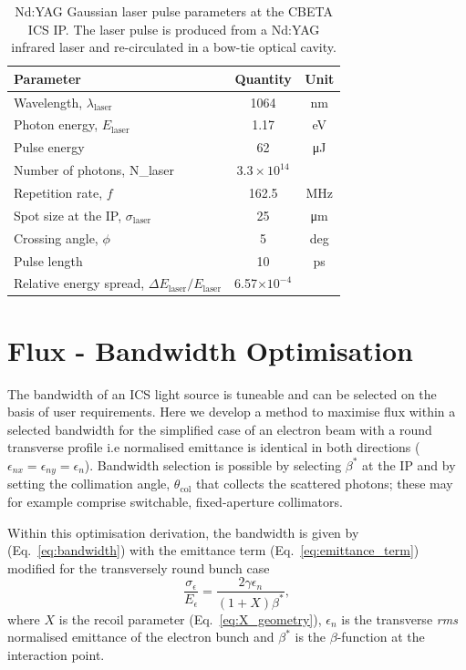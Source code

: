 \documentclass[../main.tex]{subfiles}
\begin{document}
\begin{table}[!h]
\centering
\caption{Nd:YAG Gaussian laser pulse parameters at the CBETA ICS IP. The laser pulse is produced from a Nd:YAG infrared laser and re-circulated in a bow-tie optical cavity.}
\begin{tabular}{lcc}
\hline\hline
Parameter & Quantity & Unit \\
\hline
Wavelength, $\lambda_\textrm{laser}$ & 1064 & nm\\
Photon energy, $E_\textrm{laser}$ & 1.17 & eV\\
Pulse energy  & 62 & \si{\micro\joule}\\
Number of photons, N_{\textrm{laser}} & $3.3\times 10^{14}$\\ 
Repetition rate, $f$ & 162.5 & MHz\\
Spot size at the IP, $\sigma_\textrm{laser}$ & 25 & \si{\micro\meter}\\
Crossing angle, $\phi$ & 5 & deg \\
Pulse length  & 10 & ps\\
Relative energy spread, $\Delta E_\textrm{laser}/E_\textrm{laser}$ & 6.57$\times 10^{-4}$ &   \\
\hline\hline
\end{tabular}
\label{TABLE:CBETA_laser_pulse_design_parameters}
\end{table}

\section{Flux - Bandwidth Optimisation}

The bandwidth of an ICS light source is tuneable and can be selected on the basis of user requirements. Here we develop a method to maximise flux within a selected bandwidth for the simplified case of an electron beam with a round transverse profile i.e normalised emittance is identical in both directions ($\epsilon_{nx} = \epsilon_{ny} = \epsilon_{n}$). Bandwidth selection is possible by selecting $\beta^{*}$ at the IP and by setting the collimation angle, $\theta_{\mathrm{col}}$ that collects the scattered photons; these may for example comprise switchable, fixed-aperture collimators.

Within this optimisation derivation, the bandwidth is given by (Eq.~\ref{eq:bandwidth}) with the emittance term (Eq.~\ref{eq:emittance_term}) modified for the transversely round bunch case
\begin{equation}
\frac{\sigma_{\epsilon}}{E_{\epsilon}} = \frac{2\gamma\epsilon_{n}}{\left(1+X\right)\beta^{*}},
\label{eq:emittance_term_round_beam}    
\end{equation}
where $X$ is the recoil parameter (Eq.~\ref{eq:X_geometry}), $\epsilon_{n}$ is the transverse \textit{rms} normalised emittance of the electron bunch and $\beta^{*}$ is the $\beta$-function at the interaction point.
\end{document}
